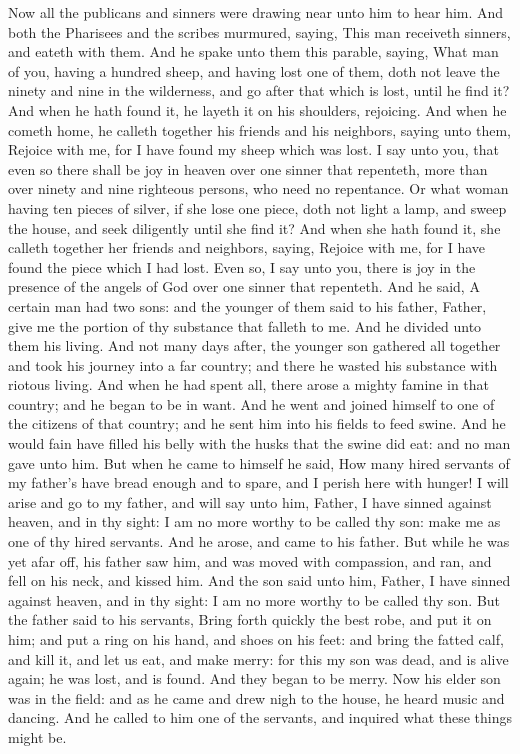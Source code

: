 Now all the publicans and sinners were drawing near unto him to hear him. And both the Pharisees and the scribes murmured, saying, This man receiveth sinners, and eateth with them.  And he spake unto them this parable, saying, What man of you, having a hundred sheep, and having lost one of them, doth not leave the ninety and nine in the wilderness, and go after that which is lost, until he find it? And when he hath found it, he layeth it on his shoulders, rejoicing. And when he cometh home, he calleth together his friends and his neighbors, saying unto them, Rejoice with me, for I have found my sheep which was lost. I say unto you, that even so there shall be joy in heaven over one sinner that repenteth, more than over ninety and nine righteous persons, who need no repentance.  Or what woman having ten pieces of silver, if she lose one piece, doth not light a lamp, and sweep the house, and seek diligently until she find it? And when she hath found it, she calleth together her friends and neighbors, saying, Rejoice with me, for I have found the piece which I had lost. Even so, I say unto you, there is joy in the presence of the angels of God over one sinner that repenteth.  And he said, A certain man had two sons: and the younger of them said to his father, Father, give me the portion of thy substance that falleth to me. And he divided unto them his living. And not many days after, the younger son gathered all together and took his journey into a far country; and there he wasted his substance with riotous living. And when he had spent all, there arose a mighty famine in that country; and he began to be in want. And he went and joined himself to one of the citizens of that country; and he sent him into his fields to feed swine. And he would fain have filled his belly with the husks that the swine did eat: and no man gave unto him. But when he came to himself he said, How many hired servants of my father’s have bread enough and to spare, and I perish here with hunger! I will arise and go to my father, and will say unto him, Father, I have sinned against heaven, and in thy sight: I am no more worthy to be called thy son: make me as one of thy hired servants. And he arose, and came to his father. But while he was yet afar off, his father saw him, and was moved with compassion, and ran, and fell on his neck, and kissed him. And the son said unto him, Father, I have sinned against heaven, and in thy sight: I am no more worthy to be called thy son. But the father said to his servants, Bring forth quickly the best robe, and put it on him; and put a ring on his hand, and shoes on his feet: and bring the fatted calf, and kill it, and let us eat, and make merry: for this my son was dead, and is alive again; he was lost, and is found. And they began to be merry. Now his elder son was in the field: and as he came and drew nigh to the house, he heard music and dancing. And he called to him one of the servants, and inquired what these things might be. 